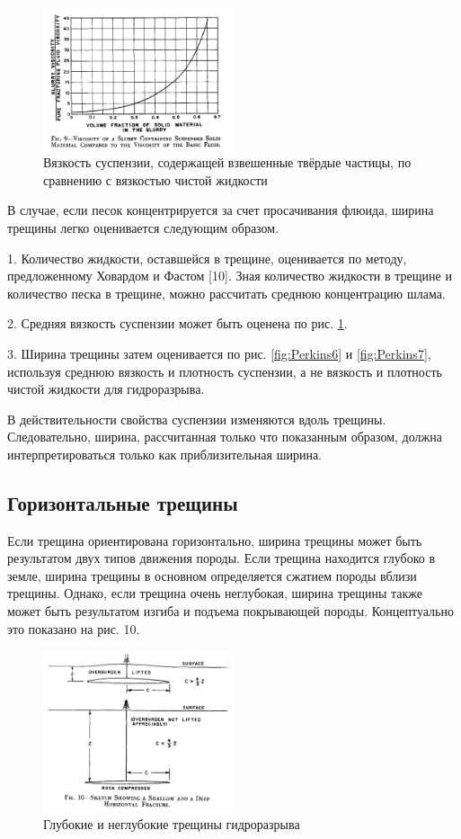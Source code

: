 \documentclass[a4paper, 12pt]{article}
\begin{document}
\begin{figure}[H]
\center
\includegraphics[width=0.5\textwidth]{Perkins_9}
\caption{Вязкость суспензии, содержащей взвешенные твёрдые частицы, по сравнению с вязкостью чистой жидкости}
\label{fig:Perkins9}
\end{figure}

В случае, если песок концентрируется за счет просачивания флюида, ширина трещины легко оценивается следующим образом.

1. Количество жидкости, оставшейся в трещине, оценивается по методу, предложенному Ховардом и Фастом [10].
Зная количество жидкости в трещине и количество песка в трещине, можно рассчитать среднюю концентрацию шлама.

2. Средняя вязкость суспензии может быть оценена по рис. \ref{fig:Perkins9}.

3. Ширина трещины затем оценивается по рис. \ref{fig:Perkins6} и \ref{fig:Perkins7}, используя среднюю вязкость и плотность суспензии, а не вязкость и плотность чистой жидкости для гидроразрыва.

В действительности свойства суспензии изменяются вдоль трещины.
Следовательно, ширина, рассчитанная только что показанным образом, должна интерпретироваться только как приблизительная ширина.

\subsection{Горизонтальные трещины}

Если трещина ориентирована горизонтально, ширина трещины может быть результатом двух типов движения породы.
Если трещина находится глубоко в земле, ширина трещины в основном определяется сжатием породы вблизи трещины.
Однако, если трещина очень неглубокая, ширина трещины также может быть результатом изгиба и подъема покрывающей породы.
Концептуально это показано на рис. 10.

\begin{figure}[H]
\center
\includegraphics[width=0.5\textwidth]{Perkins_10}
\caption{Глубокие и неглубокие трещины гидроразрыва}
\label{fig:Perkins10}
\end{figure}
\end{document}
